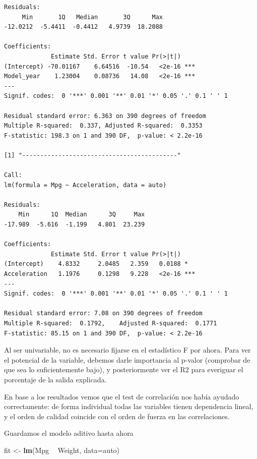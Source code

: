 \documentclass[
]{article}
\newenvironment{Shaded}{\begin{snugshade}}{\end{snugshade}}
\newcommand{\DataTypeTok}[1]{\textcolor[rgb]{0.13,0.29,0.53}{#1}}
\newcommand{\KeywordTok}[1]{\textcolor[rgb]{0.13,0.29,0.53}{\textbf{#1}}}
\newcommand{\NormalTok}[1]{#1}
\newcommand{\OperatorTok}[1]{\textcolor[rgb]{0.81,0.36,0.00}{\textbf{#1}}}
\newcommand{\StringTok}[1]{\textcolor[rgb]{0.31,0.60,0.02}{#1}}
\begin{document}
\begin{verbatim}
Residuals:
     Min       1Q   Median       3Q      Max 
-12.0212  -5.4411  -0.4412   4.9739  18.2088 

Coefficients:
             Estimate Std. Error t value Pr(>|t|)    
(Intercept) -70.01167    6.64516  -10.54   <2e-16 ***
Model_year    1.23004    0.08736   14.08   <2e-16 ***
---
Signif. codes:  0 '***' 0.001 '**' 0.01 '*' 0.05 '.' 0.1 ' ' 1

Residual standard error: 6.363 on 390 degrees of freedom
Multiple R-squared:  0.337, Adjusted R-squared:  0.3353 
F-statistic: 198.3 on 1 and 390 DF,  p-value: < 2.2e-16

[1] "-------------------------------------------"

Call:
lm(formula = Mpg ~ Acceleration, data = auto)

Residuals:
    Min      1Q  Median      3Q     Max 
-17.989  -5.616  -1.199   4.801  23.239 

Coefficients:
             Estimate Std. Error t value Pr(>|t|)    
(Intercept)    4.8332     2.0485   2.359   0.0188 *  
Acceleration   1.1976     0.1298   9.228   <2e-16 ***
---
Signif. codes:  0 '***' 0.001 '**' 0.01 '*' 0.05 '.' 0.1 ' ' 1

Residual standard error: 7.08 on 390 degrees of freedom
Multiple R-squared:  0.1792,    Adjusted R-squared:  0.1771 
F-statistic: 85.15 on 1 and 390 DF,  p-value: < 2.2e-16
\end{verbatim}

Al ser univariable, no es necesario fijarse en el estadístico F por
ahora. Para ver el potencial de la variable, debemos darle importancia
al p-valor (comprobar de que sea lo suficientemente bajo), y
posteriormente ver el R2 para everiguar el porcentaje de la salida
explicada.

En base a los resultados vemos que el test de correlación nos había
ayudado correctamente: de forma individual todas las variables tienen
dependencia lineal, y el orden de calidad coincide con el orden de
fuerza en las correlaciones.

Guardamos el modelo aditivo hasta ahora

\begin{Shaded}
\begin{Highlighting}[]
\NormalTok{fit <-}\StringTok{ }\KeywordTok{lm}\NormalTok{(Mpg }\OperatorTok{~}\StringTok{ }\NormalTok{Weight, }\DataTypeTok{data=}\NormalTok{auto)}
\end{Highlighting}
\end{Shaded}
\end{document}
